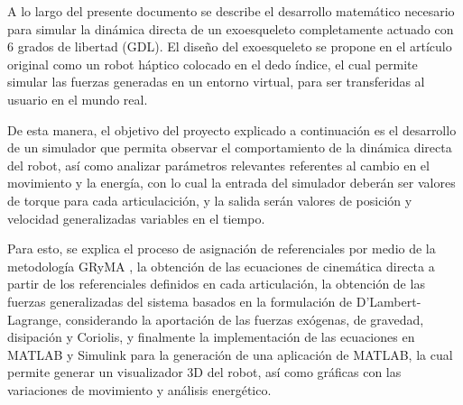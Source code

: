 A lo largo del presente documento se describe el desarrollo matemático necesario para 
simular la dinámica directa de un exoesqueleto completamente actuado con 6 grados de 
libertad (GDL). El diseño del exoesqueleto se propone en el artículo original \cite{hexotrac} como un robot háptico 
colocado en el dedo índice, el cual permite simular las fuerzas generadas en un entorno virtual, 
para ser transferidas al usuario en el mundo real. 

De esta manera, el objetivo del proyecto explicado a continuación es el desarrollo de un simulador 
que permita observar el comportamiento de la dinámica directa del robot, así como analizar parámetros 
relevantes referentes al cambio en el movimiento y la energía, con lo cual la entrada del simulador deberán 
ser valores de torque para cada articulacición, y la salida serán valores de posición y velocidad 
generalizadas variables en el tiempo.

Para esto, se explica el proceso de asignación de referenciales por medio de la metodología GRyMA \cite{rigid_multibody},
la obtención de las ecuaciones de cinemática directa a partir de los referenciales definidos en cada articulación, 
la obtención de las fuerzas generalizadas del sistema basados en la formulación de D'Lambert-Lagrange, considerando 
la aportación de las fuerzas exógenas, de gravedad, disipación y Coriolis, y finalmente la implementación de las 
ecuaciones en MATLAB y Simulink para la generación de una aplicación de MATLAB, la cual permite generar un visualizador 
3D del robot, así como gráficas con las variaciones de movimiento y análisis energético.
